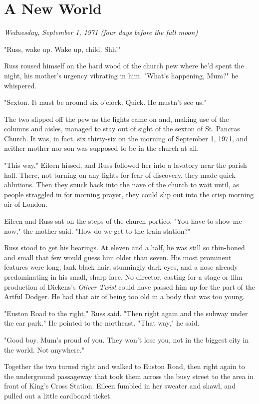 
\chapter{A New World}

\emph{Wednesday, September 1, 1971 (four days before the full moon)}

"Russ, wake up. Wake up, child. Shh!"

Russ roused himself on the hard wood of the church pew where he'd spent the night, his mother's urgency vibrating in him. "What's happening, Mum?" he whispered.

"Sexton. It must be around six o'clock. Quick. He mustn't see us."

The two slipped off the pew as the lights came on and, making use of the columns and aisles, managed to stay out of sight of the sexton of St. Pancras Church. It was, in fact, six thirty-six on the morning of September 1, 1971, and neither mother nor son was supposed to be in the church at all.

"This way," Eileen hissed, and Russ followed her into a lavatory near the parish hall. There, not turning on any lights for fear of discovery, they made quick ablutions. Then they snuck back into the nave of the church to wait until, as people straggled in for morning prayer, they could slip out into the crisp morning air of London.

Eileen and Russ sat on the steps of the church portico. "You have to show me now," the mother said. "How do we get to the train station?"

Russ stood to get his bearings. At eleven and a half, he was still so thin-boned and small that few would guess him older than seven. His most prominent features were long, lank black hair, stunningly dark eyes, and a nose already predominating in his small, sharp face. No director, casting for a stage or film production of Dickens's \emph{Oliver Twist} could have passed him up for the part of the Artful Dodger. He had that air of being too old in a body that was too young.

"Euston Road to the right," Russ said. "Then right again and the subway under the car park." He pointed to the northeast. "That way," he said.

"Good boy. Mum's proud of you. They won't lose you, not in the biggest city in the world. Not anywhere."

Together the two turned right and walked to Euston Road, then right again to the underground passageway that took them across the busy street to the area in front of King's Cross Station. Eileen fumbled in her sweater and shawl, and pulled out a little cardboard ticket.

